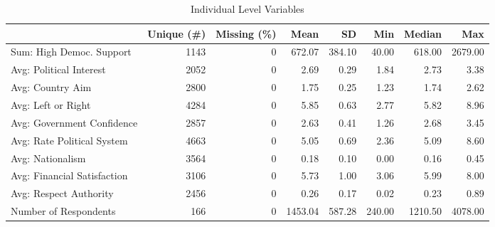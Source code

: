 \begin{table}

\caption{Individual Level Variables}
\centering
\begin{tabular}[t]{lrrrrrrr}
\toprule
  & Unique (\#) & Missing (\%) & Mean & SD & Min & Median & Max\\
\midrule
Sum: High Democ. Support & 1143 & 0 & \num{672.07} & \num{384.10} & \num{40.00} & \num{618.00} & \num{2679.00}\\
Avg: Political Interest & 2052 & 0 & \num{2.69} & \num{0.29} & \num{1.84} & \num{2.73} & \num{3.38}\\
Avg: Country Aim & 2800 & 0 & \num{1.75} & \num{0.25} & \num{1.23} & \num{1.74} & \num{2.62}\\
Avg: Left or Right & 4284 & 0 & \num{5.85} & \num{0.63} & \num{2.77} & \num{5.82} & \num{8.96}\\
Avg: Government Confidence & 2857 & 0 & \num{2.63} & \num{0.41} & \num{1.26} & \num{2.68} & \num{3.45}\\
Avg: Rate Political System & 4663 & 0 & \num{5.05} & \num{0.69} & \num{2.36} & \num{5.09} & \num{8.60}\\
Avg: Nationalism & 3564 & 0 & \num{0.18} & \num{0.10} & \num{0.00} & \num{0.16} & \num{0.45}\\
Avg: Financial Satisfaction & 3106 & 0 & \num{5.73} & \num{1.00} & \num{3.06} & \num{5.99} & \num{8.00}\\
Avg: Respect Authority & 2456 & 0 & \num{0.26} & \num{0.17} & \num{0.02} & \num{0.23} & \num{0.89}\\
Number of Respondents & 166 & 0 & \num{1453.04} & \num{587.28} & \num{240.00} & \num{1210.50} & \num{4078.00}\\
\bottomrule
\end{tabular}
\end{table}
